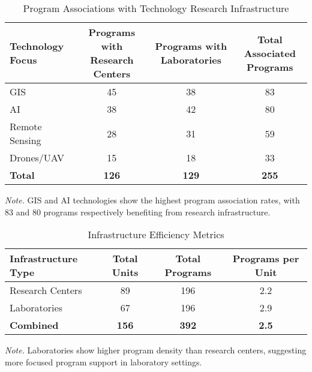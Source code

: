 \begin{table}[H]
\centering
\caption{Program Associations with Technology Research Infrastructure}
\label{tab:rq9_program_associations}
\begin{tabular}{lccc}
\toprule
\textbf{Technology Focus} & \textbf{Programs with Research Centers} & \textbf{Programs with Laboratories} & \textbf{Total Associated Programs} \\
\midrule
GIS & 45 & 38 & 83 \\
AI & 38 & 42 & 80 \\
Remote Sensing & 28 & 31 & 59 \\
Drones/UAV & 15 & 18 & 33 \\
\midrule
\textbf{Total} & \textbf{126} & \textbf{129} & \textbf{255} \\
\bottomrule
\end{tabular}
\small
\textit{Note.} GIS and AI technologies show the highest program association rates, with 83 and 80 programs respectively benefiting from research infrastructure.
\end{table}

\begin{table}[H]
\centering
\caption{Infrastructure Efficiency Metrics}
\label{tab:rq9_infrastructure_efficiency}
\begin{tabular}{lccc}
\toprule
\textbf{Infrastructure Type} & \textbf{Total Units} & \textbf{Total Programs} & \textbf{Programs per Unit} \\
\midrule
Research Centers & 89 & 196 & 2.2 \\
Laboratories & 67 & 196 & 2.9 \\
\midrule
\textbf{Combined} & \textbf{156} & \textbf{392} & \textbf{2.5} \\
\bottomrule
\end{tabular}
\small
\textit{Note.} Laboratories show higher program density than research centers, suggesting more focused program support in laboratory settings.
\end{table}

